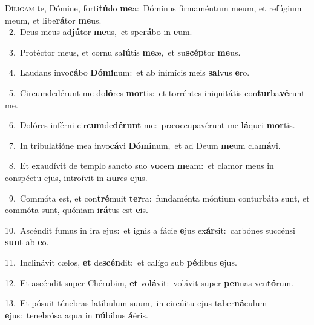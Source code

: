 \lettrine{\initial\textcolor{\initialcolor}{D}}{íligam} te, Dómine, forti\-\textbf{tú}\-do \textbf{me}\-a:~\star Dóminus firmaméntum meum, et refúgium meum, et libe\-\textbf{rá}\-tor \textbf{me}\-us.\\
{\numbfont\textcolor{\numbcolor}{~2.}}~Deus meus ad\-\textbf{jú}\-tor \textbf{me}\-us,~\star et spe\-\textbf{rá}\-bo in \textbf{e}\-um.\par
{\numbfont\textcolor{\numbcolor}{~3.}}~Protéctor meus, et cornu sa\-\textbf{lú}\-tis \textbf{me}\-æ,~\star et su\-\textbf{scép}\-tor \textbf{me}\-us.\par
{\numbfont\textcolor{\numbcolor}{~4.}}~Laudans invo\-\textbf{cá}\-bo \textbf{Dó}\-\textbf{mi}num:~\star et ab inimícis meis \textbf{sal}\-vus \textbf{e}\-ro.\par
{\numbfont\textcolor{\numbcolor}{~5.}}~Circumdedérunt me do\-\textbf{ló}\-res \textbf{mor}\-tis:~\star et torréntes iniquitátis con\-\textbf{tur}\-ba\-\textbf{vé}\-runt me.\par
{\numbfont\textcolor{\numbcolor}{~6.}}~Dolóres inférni cir\-\textbf{cum}\-de\-\textbf{dé}\-\textbf{runt} me:~\star præoccupavérunt me \textbf{lá}\-quei \textbf{mor}\-tis.\par
{\numbfont\textcolor{\numbcolor}{~7.}}~In tribulatióne mea invo\-\textbf{cá}\-vi \textbf{Dó}\-\textbf{mi}num,~\star et ad Deum \textbf{me}\-um cla\-\textbf{má}\-vi.\par
{\numbfont\textcolor{\numbcolor}{~8.}}~Et exaudívit de templo sancto suo \textbf{vo}\-cem \textbf{me}\-am:~\star et clamor meus in conspéctu ejus, introívit in \textbf{au}\-res \textbf{e}\-jus.\par
{\numbfont\textcolor{\numbcolor}{~9.}}~Commóta est, et con\-\textbf{tré}\-muit \textbf{ter}\-ra:~\star fundaménta móntium conturbáta sunt, et commóta sunt, quóniam i\-\textbf{rá}\-tus est \textbf{e}\-is.\par
{\numbfont\textcolor{\numbcolor}{10.}}~Ascéndit fumus in ira ejus:~\dagger et ignis a fácie \textbf{e}\-jus ex\-\textbf{ár}\-sit:~\star carbónes succénsi \textbf{sunt} ab \textbf{e}\-o.\par
{\numbfont\textcolor{\numbcolor}{11.}}~Inclinávit cælos, \textbf{et} de\-\textbf{scén}\-dit:~\star et calígo sub \textbf{pé}\-dibus \textbf{e}\-jus.\par
{\numbfont\textcolor{\numbcolor}{12.}}~Et ascéndit super Chérubim, \textbf{et} vo\-\textbf{lá}\-vit:~\star volávit super \textbf{pen}\-nas ven\-\textbf{tó}\-rum.\par
{\numbfont\textcolor{\numbcolor}{13.}}~Et pósuit ténebras latíbulum suum,~\dagger in circúitu ejus taber\-\textbf{ná}\-culum \textbf{e}\-jus:~\star tenebrósa aqua in \textbf{nú}\-bibus \textbf{á}\-ëris.\par
